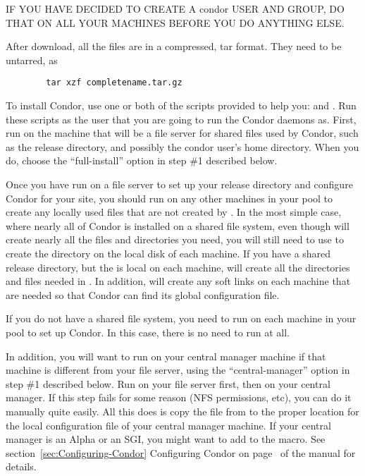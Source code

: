 IF YOU HAVE DECIDED TO CREATE A condor USER AND GROUP, DO
THAT ON ALL YOUR MACHINES BEFORE YOU DO ANYTHING ELSE.

After download, all the files are in a compressed, tar format.
They need to be untarred, as
\begin{verbatim}
        tar xzf completename.tar.gz
\end{verbatim}

To install Condor, use one or both of the scripts
provided to help you:  and .
Run these scripts as the user that you are going to run the Condor
daemons as.  First, run  on the machine that will be a
file server for shared files used by Condor, such as the release
directory, and possibly the condor user's home directory.  When you
do, choose the ``full-install'' option in step \#1 described below.

Once you have run  on a file server to set up your
release directory and configure Condor for your site, you should run
 on any other machines in your pool to create any locally
used files that are not created by .  In the most
simple case, where nearly all of Condor is installed on a shared file
system, even though  will create nearly all the files
and directories you need, you will still need to use  to
create the  directory on the local disk of each machine.
If you have a shared release directory, but the  is
local on each machine,  will create all the directories
and files needed in .  In addition, 
will create any soft links on each machine that are needed so that
Condor can find its global configuration file.

If you do not have a shared file system, you need to run
 on each machine in your pool to set up Condor.  In
this case, there is no need to run  at all.

In addition, you will want to run  on your central
manager machine if that machine is different from your file server,
using the ``central-manager'' option in step \#1 described below.  Run
 on your file server first, then on your central
manager.  If this step fails for some reason (NFS permissions, etc),
you can do it manually quite easily.  All this does is copy the
 file from
 to the proper location for the local configuration
file of your central manager machine.  If your central manager is an
Alpha or an SGI, you might want to add  to the
 macro.  See
section~\ref{sec:Configuring-Condor} Configuring Condor on
page~\pageref{sec:Configuring-Condor} of the manual for details.

